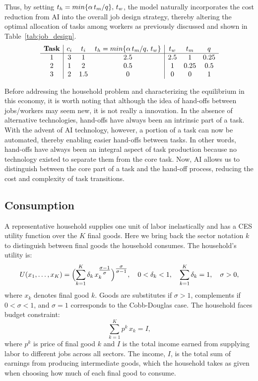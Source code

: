 \documentclass{article}
\theoremstyle{plain}
\theoremstyle{plain}
\begin{document}
Thus, by setting $t_{h} = min\{\alpha\, t_{m}/q\}, \, t_{w}$, the model naturally incorporates the cost reduction from AI into the overall job design strategy, thereby altering the optimal allocation of tasks among workers as previously discussed and shown in Table~\ref{tab:job_design}.
\[
\begin{array}{c|ccc|ccc}
\textbf{Task} & c_{i} & t_{i} & t_{h}=min\{\alpha \, t_{m}/q, \, t_{w}\} & t_{w} & t_{m} & q \\ \hline
1 & 3   & 1 & 2.5   & 2.5 & 1 & 0.25\\
2 & 1 & 2 & 0.5  & 1 & 0.25 & 0.5\\
3 & 2  & 1.5  & 0 & 0   & 0  & 1\\
\end{array}
\]

Before addressing the household problem and characterizing the equilibrium in this economy, it is worth noting that although the idea of hand-offs between jobs/workers may seem new, it is not really a innovation.
In the absence of alternative technologies, hand-offs have always been an intrinsic part of a task.
With the advent of AI technology, however, a portion of a task can now be automated, thereby enabling easier hand-offs between tasks.
In other words, hand-offs have always been an integral aspect of task production because no technology existed to separate them from the core task.
Now, AI allows us to distinguish between the core part of a task and the hand-off process, reducing the cost and complexity of task transitions.


\subsection{Consumption} 
\label{sec:household_GE}
A representative household supplies one unit of labor inelastically and has a CES utility function over the $K$ final goods.
Here we bring back the sector notation $k$ to distinguish between final goods the household consumes. The household's utility is:
\[
U(x_{1}, \ldots, x_{K}) = \Bigl(\sum_{k=1}^{K} \delta_k \,x_k^{\tfrac{\sigma - 1}{\sigma}}\Bigr)^{\tfrac{\sigma}{\sigma-1}},
\quad
0 < \delta_k < 1,
\quad
\sum_{k=1}^{K} \delta_k = 1,
\quad
\sigma > 0,
\]  
where $x_k$ denotes final good $k$.
Goods are substitutes if $ \sigma > 1$, complements if $0 < \sigma < 1$, and $\sigma = 1$ corresponds to the Cobb-Douglas case.  
The household faces budget constraint:  
\[
\sum_{k=1}^K p^k \,x_k = I,
\]  
where $p^k$ is price of final good $k$ and $I$ is the total income earned from supplying labor to different jobs across all sectors.  
The income, $I$, is the total sum of earnings from producing intermediate goods, which the household takes as given when choosing how much of each final good to consume.
\end{document}
